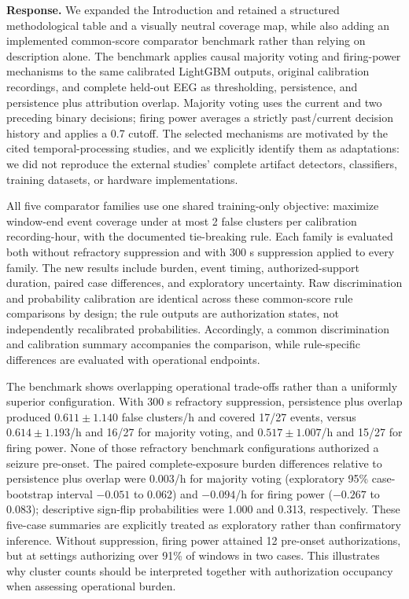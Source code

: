 \documentclass[11pt,a4paper]{article}
\begin{document}
\textbf{Response.} We expanded the Introduction and retained a structured methodological table and a visually neutral coverage map, while also adding an implemented common-score comparator benchmark rather than relying on description alone. The benchmark applies causal majority voting and firing-power mechanisms to the same calibrated LightGBM outputs, original calibration recordings, and complete held-out EEG as thresholding, persistence, and persistence plus attribution overlap. Majority voting uses the current and two preceding binary decisions; firing power averages a strictly past/current decision history and applies a 0.7 cutoff. The selected mechanisms are motivated by the cited temporal-processing studies, and we explicitly identify them as adaptations: we did not reproduce the external studies' complete artifact detectors, classifiers, training datasets, or hardware implementations.

All five comparator families use one shared training-only objective: maximize window-end event coverage under at most 2 false clusters per calibration recording-hour, with the documented tie-breaking rule. Each family is evaluated both without refractory suppression and with 300 s suppression applied to every family. The new results include burden, event timing, authorized-support duration, paired case differences, and exploratory uncertainty. Raw discrimination and probability calibration are identical across these common-score rule comparisons by design; the rule outputs are authorization states, not independently recalibrated probabilities. Accordingly, a common discrimination and calibration summary accompanies the comparison, while rule-specific differences are evaluated with operational endpoints.

The benchmark shows overlapping operational trade-offs rather than a uniformly superior configuration. With 300 s refractory suppression, persistence plus overlap produced $0.611\pm1.140$ false clusters/h and covered 17/27 events, versus $0.614\pm1.193$/h and 16/27 for majority voting, and $0.517\pm1.007$/h and 15/27 for firing power. None of those refractory benchmark configurations authorized a seizure pre-onset. The paired complete-exposure burden differences relative to persistence plus overlap were 0.003/h for majority voting (exploratory 95\% case-bootstrap interval $-0.051$ to 0.062) and $-0.094$/h for firing power ($-0.267$ to 0.083); descriptive sign-flip probabilities were 1.000 and 0.313, respectively. These five-case summaries are explicitly treated as exploratory rather than confirmatory inference. Without suppression, firing power attained 12 pre-onset authorizations, but at settings authorizing over 91\% of windows in two cases. This illustrates why cluster counts should be interpreted together with authorization occupancy when assessing operational burden.
\end{document}
